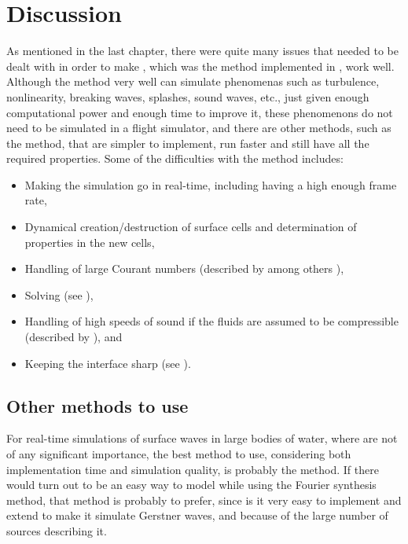 \chapter{Discussion}

As mentioned in the last chapter, there were quite many issues that needed to be dealt with in order to make \thismethod, which was the method implemented in \thisprojectwork, work well. Although the method very well can simulate phenomenas such as turbulence, nonlinearity, breaking waves, splashes, sound waves, etc., just given enough computational power and enough time to improve it, these phenomenons do not need to be simulated in a flight simulator, and there are other methods, such as the \LPD method, that are simpler to implement, run faster and still have all the required properties. Some of the difficulties with the method includes:

\begin{itemize}
    \item Making the simulation go in real-time, including having a high enough frame rate,
    \item Dynamical creation/destruction of surface cells and determination of properties in the new cells,
    \item Handling of large Courant numbers (described by among others \citet{Stam1999,Lentine2012}),
    \item Solving  (see ),
    \item Handling of high speeds of sound if the fluids are assumed to be compressible (described by \citet{Kwatra2009}), and
    \item Keeping the interface sharp (see ).
\end{itemize}

\section{Other methods to use}

For real-time simulations of surface waves in large bodies of water, where  are not of any significant importance, the best method to use, considering both implementation time and simulation quality, is probably the \LPD method. If there would turn out to be an easy way to model \FSI while using the Fourier synthesis method, that method is probably to prefer, since is it very easy to implement and extend to make it simulate Gerstner waves, and because of the large number of sources describing it.

